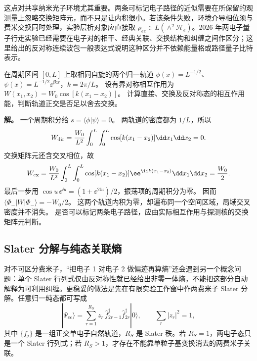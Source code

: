 这点对共享纳米光子环境尤其重要。两条可标记电子路径的近似需要在所保留的观测量上忽略交换矩阵元，而不只是让内积很小。若该条件失败，环境介导相位须与费米交换同时处理，实验层析对象应直接取
$\rho_{ee}\in L(\wedge^2\mathcal H_e)$。2026 年两电子量子行走实验已经需要在电子对的相干、经典关联、交换结构和纠缠之间作区分\cite{Tziperman2026TwoElectron}；这里给出的反对称连续波包一般表达式说明这种区分并不依赖能量格或路径量子比特表示。

\begin{exbox}[正交波包仍可有有限交换能]
在周期区间 $[0,L]$ 上取相同自旋的两个归一轨道
$\phi(x)=L^{-1/2}$、$\psi(x)=L^{-1/2}\ee^{\ii kx}$，$k=2\pi/L$。
设有界对称相互作用为 $W(x_1,x_2)=W_0\cos[k(x_1-x_2)]$。
计算直接、交换及反对称态的相互作用能，判断轨道正交是否足以舍去交换。

\textbf{解。} 一个周期积分给 $s=\langle\phi|\psi\rangle=0$。
两轨道的密度都为 $1/L$，所以
\[
W_{\rm dir}=\frac{W_0}{L^2}\int_0^L\int_0^L
\cos[k(x_1-x_2)]\dd x_1\dd x_2=0.
\]
交换矩阵元还含交叉相位，故
\[
W_{\rm ex}=\frac{W_0}{L^2}\int_0^L\int_0^L
\cos[k(x_1-x_2)]\ee^{\ii k(x_1-x_2)}\dd x_1\dd x_2=\frac{W_0}{2}.
\]
最后一步用 $\cos u\,\ee^{\ii u}=(1+\ee^{2\ii u})/2$，振荡项的周期积分为零。
因而 $\langle\Phi_-|W|\Phi_-\rangle=-W_0/2$。
这两个轨道内积为零，却遍布同一个空间区域，局域交叉密度并不消失。
是否可以标记两条电子路径，应由实际相互作用与探测核的交换矩阵元判断。
\end{exbox}

\subsection{Slater 分解与纯态关联熵}

对不可区分费米子，“把电子 1 对电子 2 做偏迹再算熵”还会遇到另一个概念问题：单个 Slater 行列式仅由反对称性就已经给出非零一体熵，不能把这部分自动解释为可利用纠缠。更稳妥的做法是先在有限实验工作窗中作两费米子 Slater 分解。任意归一纯态都可写成
\begin{equation}
{
|\Psi_{ee}\rangle
=\sum_{r=1}^{R_S}z_r\,
\hat f_{2r-1}^\dagger\hat f_{2r}^\dagger|0\rangle,
\qquad
\sum_r|z_r|^2=1,}
\label{eq:two_fermion_slater_decomposition}
\end{equation}
其中 $\{f_j\}$ 是一组正交单电子自然轨道，$R_S$ 是 Slater 秩。若 $R_S=1$，两电子态只是一个 Slater 行列式；若 $R_S>1$，才存在不能靠单粒子基变换消去的两费米子关联。

